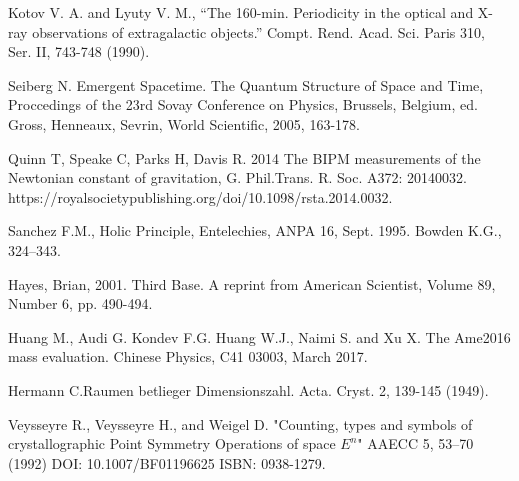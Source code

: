 \documentclass[a4paper,9pt]{article}
\begin{document}
\begin{thebibliography}{99}







 Kotov V. A. and Lyuty V. M., “The 160-min. Periodicity in the optical and X-ray observations of extragalactic objects.” Compt. Rend. Acad. Sci. Paris 310, Ser. II, 743-748 (1990).


 Seiberg N. Emergent Spacetime. The Quantum Structure of Space and Time, Proccedings of the 23rd Sovay Conference on Physics, Brussels, Belgium, ed. Gross, Henneaux, Sevrin, World Scientific, 2005, 163-178.


 Quinn T, Speake C, Parks H, Davis R. 2014 The BIPM measurements of the Newtonian constant of gravitation, G. Phil.Trans. R. Soc. A372: 20140032. https://royalsocietypublishing.org/doi/10.1098/rsta.2014.0032.

 Sanchez F.M., Holic Principle, Entelechies, ANPA 16, Sept. 1995. Bowden K.G., 324--343.

 Hayes, Brian, 2001. Third Base. A reprint from American Scientist, Volume 89, Number 6, pp. 490-494. 


 Huang M., Audi G. Kondev F.G. Huang W.J., Naimi S. and Xu X. The Ame2016 mass evaluation. Chinese Physics, C41 03003, March 2017.

 Hermann C.Raumen betlieger Dimensionszahl. Acta. Cryst. 2, 139-145 (1949). 

 Veysseyre R., Veysseyre H., and Weigel D. "Counting, types and symbols of crystallographic Point Symmetry Operations of space $E^{n}$" AAECC 5, 53--70 (1992) DOI: 10.1007/BF01196625 ISBN: 0938-1279.


\end{thebibliography}
\end{document}
